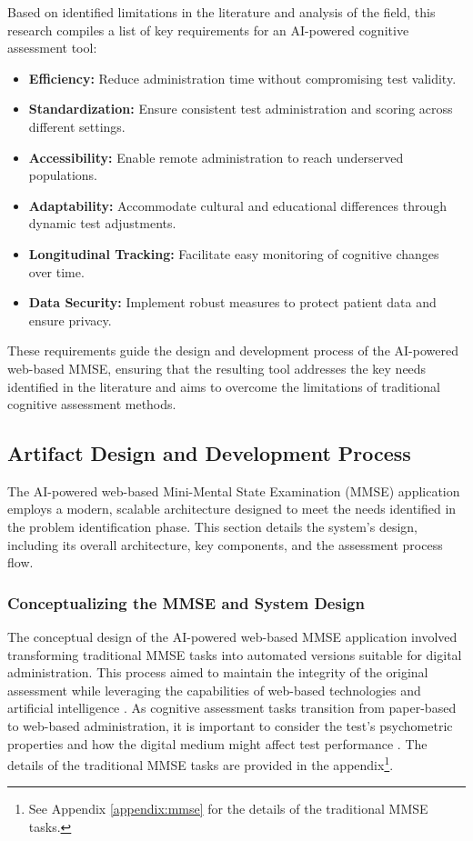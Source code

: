 Based on identified limitations in the literature and analysis of the field, this research compiles a list of key requirements for an AI-powered cognitive assessment tool:
\begin{itemize}
\item \textbf{Efficiency:} Reduce administration time without compromising test validity.
\item \textbf{Standardization:} Ensure consistent test administration and scoring across different settings.
\item \textbf{Accessibility:} Enable remote administration to reach underserved populations.
\item \textbf{Adaptability:} Accommodate cultural and educational differences through dynamic test adjustments.
\item \textbf{Longitudinal Tracking:} Facilitate easy monitoring of cognitive changes over time.
\item \textbf{Data Security:} Implement robust measures to protect patient data and ensure privacy.
\end{itemize}
These requirements guide the design and development process of the AI-powered web-based MMSE, ensuring that the resulting tool addresses the key needs identified in the literature and aims to overcome the limitations of traditional cognitive assessment methods.

\subsection{Artifact Design and Development Process}

The AI-powered web-based Mini-Mental State Examination (MMSE) application employs a modern, scalable architecture designed to meet the needs identified in the problem identification phase. This section details the system's design, including its overall architecture, key components, and the assessment process flow.

\subsubsection{Conceptualizing the MMSE and System Design}

The conceptual design of the AI-powered web-based MMSE application involved transforming traditional MMSE tasks into automated versions suitable for digital administration. This process aimed to maintain the integrity of the original assessment \cite{Folstein1975} while leveraging the capabilities of web-based technologies and artificial intelligence \cite{Bauer2012, Zygouris2017}. As cognitive assessment tasks transition from paper-based to web-based administration, it is important to consider the test's psychometric properties and how the digital medium might affect test performance \cite{Geddes2020}. The details of the traditional MMSE tasks are provided in the appendix\footnote{See Appendix \ref{appendix:mmse} for the details of the traditional MMSE tasks.}.

